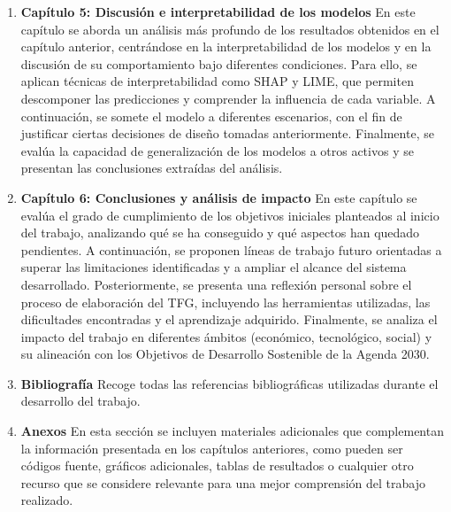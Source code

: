 \begin{enumerate}
    En este capítulo se describe la implementación, el entrenamiento y la validación de los modelos predictivos seleccionados (Random Forest, Gradient Boosting, LightGBM y LSTM) sobre los datasets optimizados obtenidos en el capítulo anterior. Para ello, se detalla la partición temporal de los datos en entrenamiento, validación y prueba, la configuración de hiperparámetros mediante búsqueda en rejilla, y el entrenamiento de cada modelo. Finalmente, se presentan los resultados obtenidos en el conjunto de prueba, se evalúa la robustez temporal mediante backtesting y se realiza una comparativa global para analizar las fortalezas de cada enfoque.
    \item \textbf{Capítulo 5: Discusión e interpretabilidad de los modelos}
    En este capítulo se aborda un análisis más profundo de los resultados obtenidos en el capítulo anterior, centrándose en la interpretabilidad de los modelos y en la discusión de su comportamiento bajo diferentes condiciones. Para ello, se aplican técnicas de interpretabilidad como SHAP y LIME, que permiten descomponer las predicciones y comprender la influencia de cada variable. A continuación, se somete el modelo a diferentes escenarios, con el fin de justificar ciertas decisiones de diseño tomadas anteriormente. Finalmente, se evalúa la capacidad de generalización de los modelos a otros activos y se presentan las conclusiones extraídas del análisis.
    \item \textbf{Capítulo 6: Conclusiones y análisis de impacto}
    En este capítulo se evalúa el grado de cumplimiento de los objetivos iniciales planteados al inicio del trabajo, analizando qué se ha conseguido y qué aspectos han quedado pendientes. A continuación, se proponen líneas de trabajo futuro orientadas a superar las limitaciones identificadas y a ampliar el alcance del sistema desarrollado. Posteriormente, se presenta una reflexión personal sobre el proceso de elaboración del TFG, incluyendo las herramientas utilizadas, las dificultades encontradas y el aprendizaje adquirido. Finalmente, se analiza el impacto del trabajo en diferentes ámbitos (económico, tecnológico, social) y su alineación con los Objetivos de Desarrollo Sostenible de la Agenda 2030.
    \item \textbf{Bibliografía}
    Recoge todas las referencias bibliográficas utilizadas durante el desarrollo del trabajo.
    \item \textbf{Anexos}
    En esta sección se incluyen materiales adicionales que complementan la información presentada en los capítulos anteriores, como pueden ser códigos fuente, gráficos adicionales, tablas de resultados o cualquier otro recurso que se considere relevante para una mejor comprensión del trabajo realizado.
\end{enumerate}